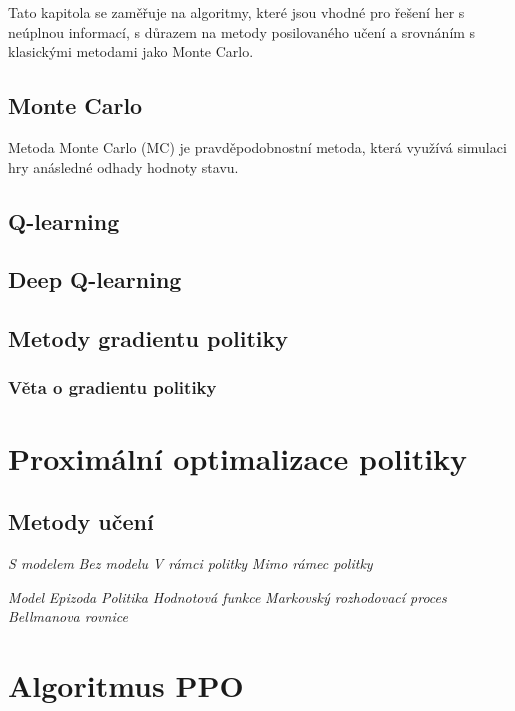 Tato kapitola se zaměřuje na algoritmy, které jsou vhodné pro řešení her s neúplnou informací, s důrazem na metody posilovaného učení a srovnáním s klasickými metodami jako Monte Carlo.

\subsection*{Monte Carlo}
Metoda Monte Carlo (MC) je pravděpodobnostní metoda, která využívá simulaci hry anásledné odhady hodnoty stavu.

\subsection*{Q-learning}
\subsection*{Deep Q-learning}
\subsection*{Metody gradientu politiky}
\subsubsection*{Věta o gradientu politiky}
\section{Proximální optimalizace politiky}
\label{sec:proximalni-optimalizace-politiky}


\subsection*{Metody učení}
\emph{S modelem}
\emph{Bez modelu}
\emph{V rámci politky}
\emph{Mimo rámec politky}

\emph{Model}
\emph{Epizoda}
\emph{Politika}
\emph{Hodnotová funkce}
\emph{Markovský rozhodovací proces}
\emph{Bellmanova rovnice}
\section{Algoritmus PPO}

